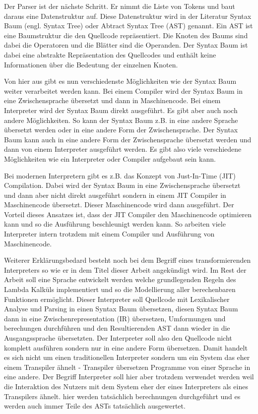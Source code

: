 \documentclass[ngerman]{article}
\newcommand{\doublelinebreak}{\par\vspace{\baselineskip}}
\begin{document}
Der Parser ist der nächste Schritt. Er nimmt die Liste von Tokens und baut daraus eine Datenstruktur auf. Diese Datenstruktur wird in der Literatur Syntax Baum (engl. Syntax Tree) oder Abtract Syntax Tree (AST) genannt. Ein AST ist eine Baumstruktur die den Quellcode repräsentiert. Die Knoten des Baums sind dabei die Operatoren und die Blätter sind die Operanden. Der Syntax Baum ist dabei eine abstrakte Repräsentation des Quellcodes und enthält keine Informationen über die Bedeutung der einzelnen Knoten. 

\doublelinebreak

Von hier aus gibt es nun verschiedenste Möglichkeiten wie der Syntax Baum weiter verarbeitet werden kann. Bei einem Compiler wird der Syntax Baum in eine Zwischensprache übersetzt und dann in Maschinencode. Bei einem Interpreter wird der Syntax Baum direkt ausgeführt. Es gibt aber auch noch andere Möglichkeiten. So kann der Syntax Baum z.B. in eine andere Sprache übersetzt werden oder in eine andere Form der Zwischensprache. Der Syntax Baum kann auch in eine andere Form der Zwischensprache übersetzt werden und dann von einem Interpreter ausgeführt werden. Es gibt also viele verschiedene Möglichkeiten wie ein Interpreter oder Compiler aufgebaut sein kann.

Bei modernen Interpretern gibt es z.B. das Konzept von Just-In-Time (JIT) Compilation. Dabei wird der Syntax Baum in eine Zwischensprache übersetzt und dann aber nicht direkt ausgeführt sondern in einem JIT Compiler in Maschinencode übersetzt. Dieser Maschinencode wird dann ausgeführt. Der Vorteil dieses Ansatzes ist, dass der JIT Compiler den Maschinencode optimieren kann und so die Ausführung beschleunigt werden kann. So arbeiten viele Interpreter intern trotzdem mit einem Compiler und Ausführung von Maschinencode.

Weiterer Erklärungsbedard besteht noch bei dem Begriff eines transformierenden Interpreters so wie er in dem Titel dieser Arbeit angekündigt wird. Im Rest der Arbeit soll eine Sprache entwickelt werden welche grundlegenden Regeln des Lambda Kalküls implementiert und so die Modellierung aller berechenbaren Funktionen ermöglicht. Dieser Interpreter soll Quellcode mit Lexikalischer Analyse und Parsing in einen Syntax Baum übersetzen, diesen Syntax Baum dann in eine Zwischenrepresentation (IR) übersetzen, Umformungen und berechungen durchführen und den Resultierenden AST dann wieder in die Ausgangssprache übersetzten. Der Interpreter soll also den Quellcode nicht komplett ausführen sondern nur in eine andere Form übersetzen. Damit handelt es sich nicht um einen traditionellen Interpreter sondern um ein System das eher einem Transpiler ähnelt - Transpiler übersetzen Programme von einer Sprache in eine andere. Der Begriff Interpreter soll hier aber trotzdem verwendet werden weil die Interaktion des Nutzers mit dem System eher der eines Interpreters als eines Transpilers ähnelt. hier werden tatsächlich berechnungen durchgeführt und es werden auch immer Teile des ASTs tatsächlich ausgewertet.
\end{document}
